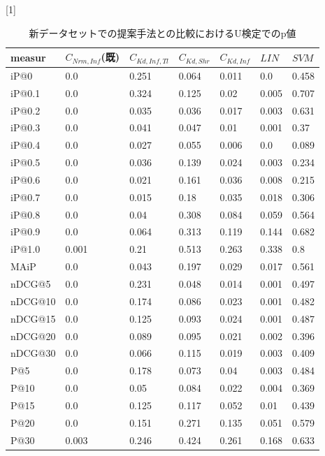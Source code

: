 \begin{table}[h]
  \caption{新データセットでの提案手法との比較におけるU検定でのp値}
\label{tbl:resultNewP}
  \begin{center} {
\scalebox{0.9}[1]{
    \begin{tabular}{|l|l|lllll|}\hline
measur&$C_{Nrm,Inf}$(既)&$C_{Kd,Inf,Tl}$&$C_{Kd,Shr}$&$C_{Kd,Inf}$&$LIN$&$SVM$\\ \hline
iP@0&0.0&0.251&0.064&0.011&0.0&0.458\\
iP@0.1&0.0&0.324&0.125&0.02&0.005&0.707\\
iP@0.2&0.0&0.035&0.036&0.017&0.003&0.631\\
iP@0.3&0.0&0.041&0.047&0.01&0.001&0.37\\
iP@0.4&0.0&0.027&0.055&0.006&0.0&0.089\\
iP@0.5&0.0&0.036&0.139&0.024&0.003&0.234\\
iP@0.6&0.0&0.021&0.161&0.036&0.008&0.215\\
iP@0.7&0.0&0.015&0.18&0.035&0.018&0.306\\
iP@0.8&0.0&0.04&0.308&0.084&0.059&0.564\\
iP@0.9&0.0&0.064&0.313&0.119&0.144&0.682\\
iP@1.0&0.001&0.21&0.513&0.263&0.338&0.8\\ \hline
MAiP&0.0&0.043&0.197&0.029&0.017&0.561\\ \hline
nDCG@5&0.0&0.231&0.048&0.014&0.001&0.497\\
nDCG@10&0.0&0.174&0.086&0.023&0.001&0.482\\
nDCG@15&0.0&0.125&0.093&0.024&0.001&0.487\\
nDCG@20&0.0&0.089&0.095&0.021&0.002&0.396\\
nDCG@30&0.0&0.066&0.115&0.019&0.003&0.409\\ \hline
P@5&0.0&0.178&0.073&0.04&0.003&0.484\\
P@10&0.0&0.05&0.084&0.022&0.004&0.369\\
P@15&0.0&0.125&0.117&0.052&0.01&0.439\\
P@20&0.0&0.151&0.271&0.135&0.051&0.579\\
P@30&0.003&0.246&0.424&0.261&0.168&0.633\\ \hline
    \end{tabular}
  }
    }
  \end{center}
\end{table}



